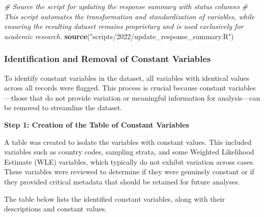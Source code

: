 \documentclass[
]{article}
\newenvironment{Shaded}{\begin{snugshade}}{\end{snugshade}}
\newcommand{\CommentTok}[1]{\textcolor[rgb]{0.56,0.35,0.01}{\textit{#1}}}
\newcommand{\FunctionTok}[1]{\textcolor[rgb]{0.13,0.29,0.53}{\textbf{#1}}}
\newcommand{\NormalTok}[1]{#1}
\newcommand{\StringTok}[1]{\textcolor[rgb]{0.31,0.60,0.02}{#1}}
\begin{document}
\begin{Shaded}
\begin{Highlighting}[]
\CommentTok{\# Source the script for updating the response summary with status columns}
\CommentTok{\# This script automates the transformation and standardization of variables, while ensuring the resulting dataset remains proprietary and is used exclusively for academic research.}
\FunctionTok{source}\NormalTok{(}\StringTok{"scripts/2022/update\_response\_summary.R"}\NormalTok{)}
\end{Highlighting}
\end{Shaded}

\hypertarget{identification-and-removal-of-constant-variables}{%
\subsubsection{Identification and Removal of Constant
Variables}\label{identification-and-removal-of-constant-variables}}

To identify constant variables in the dataset, all variables with
identical values across all records were flagged. This process is
crucial because constant variables---those that do not provide variation
or meaningful information for analysis---can be removed to streamline
the dataset.

\textbf{Step 1: Creation of the Table of Constant Variables}

A table was created to isolate the variables with constant values. This
included variables such as country codes, sampling strata, and some
Weighted Likelihood Estimate (WLE) variables, which typically do not
exhibit variation across cases. These variables were reviewed to
determine if they were genuinely constant or if they provided critical
metadata that should be retained for future analyses.

The table below lists the identified constant variables, along with
their descriptions and constant values.
\end{document}

